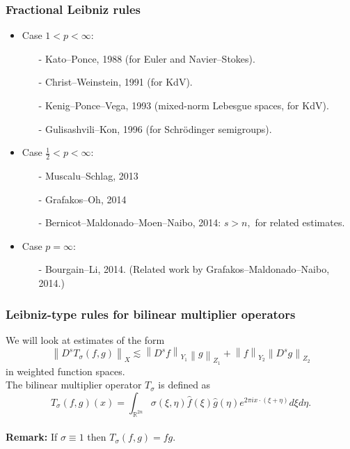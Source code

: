 \documentclass[xcolor=dvipsnames]{beamer}
\newcommand{\norm}[2]{{\left\| #1 \right\|}_{#2}}
\begin{document}
\begin{frame}\frametitle{Fractional Leibniz rules}
\begin{itemize}
\item Case $1<p<\infty:$ 
\begin{enumerate}[-]
\item[-] Kato--Ponce, 1988 (for Euler and Navier--Stokes).%

\medskip

\item[-] Christ--Weinstein, 1991 (for KdV).%

\medskip

\item[-] Kenig--Ponce--Vega, 1993 (mixed-norm Lebesgue spaces, for KdV).%

\medskip

\item[-] Gulisashvili--Kon, 1996 (for Schr\"odinger semigroups).

\end{enumerate}

\medskip 

\item Case $\frac{1}{2}<p<\infty:$  
\begin{enumerate}[-]
\item[-] Muscalu--Schlag, 2013%
\medskip
\item[-] Grafakos--Oh, 2014 
\medskip
\item[-] Bernicot--Maldonado--Moen--Naibo, 2014: $s>n,$ for related estimates.  
\end{enumerate}

\medskip 

\item Case $p=\infty:$ 
\begin{enumerate}[-]
\item[-]  Bourgain--Li, 2014. (Related work by Grafakos--Maldonado--Naibo, 2014.)
\end{enumerate}
\end{itemize}
\end{frame}

\begin{frame}\frametitle{Leibniz-type rules for bilinear multiplier operators}


 We will look at estimates of the form
\[ \norm{D^sT_\sigma(f,g)}{X} \lesssim \norm{D^sf}{Y_1}\norm{g}{Z_1}+\norm{f}{Y_2}\norm{D^sg}{Z_2} \]
in weighted function spaces.
\\
\bigskip
The bilinear multiplier operator $T_\sigma$ is defined as
 \[T_\sigma(f,g)(x) = \int_{\mathbb{R}^{2n}} \sigma(\xi,\eta) \widehat{f}(\xi)\widehat{g}(\eta) e^{2\pi i x\cdot (\xi + \eta)} d\xi d\eta.\]
 \\
\bigskip
\textbf{Remark:} If $\sigma \equiv 1$ then $T_\sigma(f,g) = fg.$


\end{frame}
\end{document}
